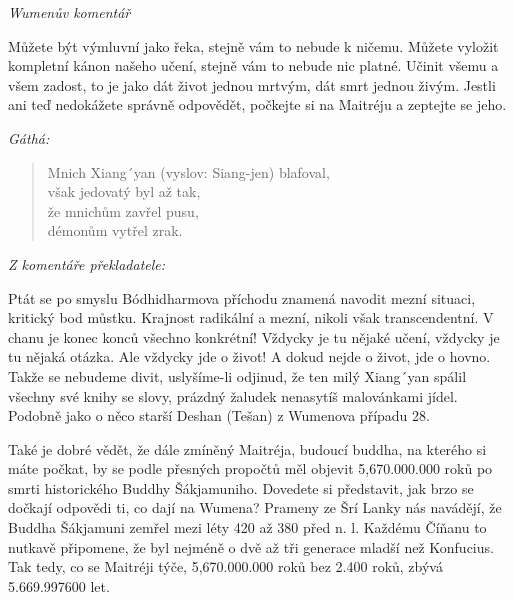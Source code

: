 \medskip
\noindent
\textit{Wumenův komentář}

\noindent
Můžete být výmluvní jako řeka, stejně vám to nebude k ničemu. Můžete vyložit kompletní kánon našeho učení, stejně vám to nebude nic platné. Učinit všemu a všem zadost, to je jako dát život jednou mrtvým, dát smrt jednou živým. Jestli ani teď nedokážete správně odpovědět, počkejte si na Maitréju a zeptejte se jeho. 

\medskip
\noindent
\textit{Gáthá:}

\begin{verse}
Mnich Xiang´yan (vyslov: Siang-jen) blafoval,\\
však jedovatý byl až tak,\\
že mnichům zavřel pusu, \\
démonům vytřel zrak. 
\end{verse}

\medskip
\noindent
\textit{Z komentáře překladatele:}

\noindent
Ptát se po smyslu Bódhidharmova příchodu znamená navodit mezní situaci, kritický bod můstku. Krajnost radikální a mezní, nikoli však transcendentní. V chanu je konec konců všechno konkrétní! Vždycky je tu nějaké učení, vždycky je tu nějaká otázka. Ale vždycky jde o život! A dokud nejde o život, jde o hovno. Takže se nebudeme divit, uslyšíme-li odjinud, že ten milý Xiang´yan spálil všechny své knihy se slovy, prázdný žaludek nenasytíš malovánkami jídel. Podobně jako o něco starší Deshan (Tešan) z Wumenova případu 28.

Také je dobré vědět, že dále zmíněný Maitréja, budoucí buddha, na kterého si máte počkat, by se podle přesných propočtů měl objevit 5,670.000.000 roků po smrti historického Buddhy Šákjamuniho. Dovedete si představit, jak brzo se dočkají odpovědi ti, co dají na Wumena? Prameny ze Šrí Lanky nás navádějí, že Buddha Šákjamuni zemřel mezi léty 420 až 380 před n. l. Každému Číňanu to nutkavě připomene, že byl nejméně o dvě až tři generace mladší než Konfucius. Tak tedy, co se Maitréji týče, 5,670.000.000 roků bez 2.400 roků, zbývá 5.669.997600 let. 


